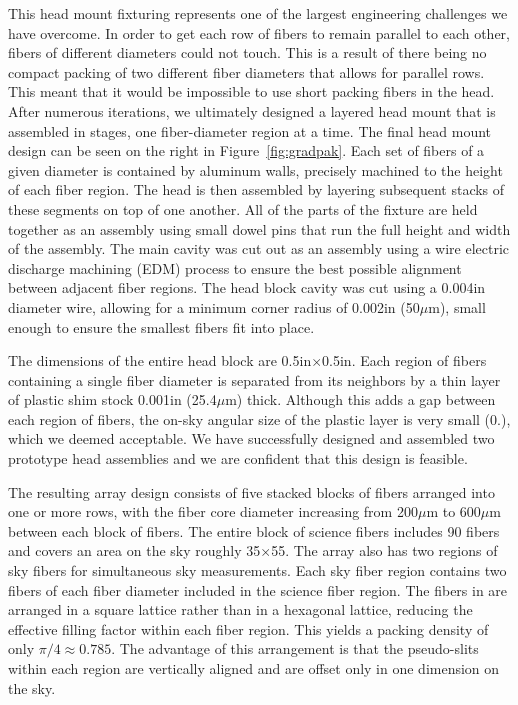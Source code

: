 This head mount fixturing represents one of the largest engineering challenges
we have overcome.  In order to get each row of fibers to remain parallel to
each other, fibers of different diameters could not touch.  This is a result
of there being no compact packing of two different fiber diameters that allows
for parallel rows.  This meant that it would be impossible to use short
packing fibers in the \GP head.  After numerous iterations, we ultimately
designed a layered head mount that is assembled in stages, one fiber-diameter
region at a time.  The final head mount design can be seen on the right in
Figure~\ref{fig:gradpak}.  Each set of fibers of a given diameter is contained
by aluminum walls, precisely machined to the height of each fiber region.  The
head is then assembled by layering subsequent stacks of these segments on top
of one another.  All of the parts of the fixture are held together as an
assembly using small dowel pins that run the full height and width of the
assembly.  The main cavity was cut out as an assembly using a wire electric
discharge machining (EDM) process to ensure the best possible alignment
between adjacent fiber regions.  The \GP head block cavity was cut using a
0.004in diameter wire, allowing for a minimum corner radius of 0.002in
(50$\mu$m), small enough to ensure the smallest fibers fit into place.

The dimensions of the entire head block are 0.5in$\times$0.5in.  Each region
of fibers containing a single fiber diameter is separated from its neighbors
by a thin layer of plastic shim stock 0.001in (25.4$\mu$m) thick.  Although
this adds a gap between each region of fibers, the on-sky angular size of the
plastic layer is very small (0.), which we deemed acceptable.  We have
successfully designed and assembled two prototype \GP head assemblies and
we are confident that this design is feasible.


The resulting array design consists of five stacked blocks of fibers arranged
into one or more rows, with the fiber core diameter increasing from 200$\mu$m
to 600$\mu$m between each block of fibers.  The entire block of science fibers
includes 90 fibers and covers an area on the sky roughly
35\arcsec$\times$55\arcsec.  The array also has two regions of sky fibers for
simultaneous sky measurements.  Each sky fiber region contains two fibers of
each fiber diameter included in the science fiber region.  The fibers in
\GP are arranged in a square lattice rather than in a hexagonal lattice,
reducing the effective filling factor within each fiber region.  This yields a
packing density of only $\pi/4 \approx 0.785$.  The advantage of this
arrangement is that the pseudo-slits within each region are vertically aligned
and are offset only in one dimension on the sky.


